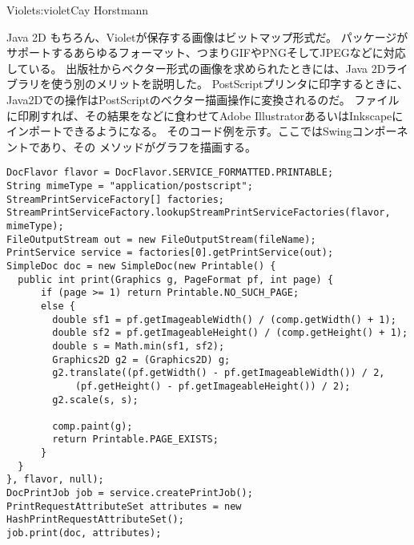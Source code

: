\begin{aosachapter}{Violet}{s:violet}{Cay Horstmann}
\begin{aosasect1}{Java 2D}
もちろん、Violetが保存する画像はビットマップ形式だ。
パッケージがサポートするあらゆるフォーマット、つまりGIFやPNGそしてJPEGなどに対応している。
出版社からベクター形式の画像を求められたときには、Java 2Dライブラリを使う別のメリットを説明した。
PostScriptプリンタに印字するときに、Java2Dでの操作はPostScriptのベクター描画操作に変換されるのだ。
ファイルに印刷すれば、その結果をなどに食わせてAdobe IllustratorあるいはInkscapeにインポートできるようになる。
そのコード例を示す。ここではSwingコンポーネントであり、その
メソッドがグラフを描画する。

\begin{verbatim}
DocFlavor flavor = DocFlavor.SERVICE_FORMATTED.PRINTABLE;
String mimeType = "application/postscript";
StreamPrintServiceFactory[] factories;
StreamPrintServiceFactory.lookupStreamPrintServiceFactories(flavor, mimeType);
FileOutputStream out = new FileOutputStream(fileName);
PrintService service = factories[0].getPrintService(out);            
SimpleDoc doc = new SimpleDoc(new Printable() {
  public int print(Graphics g, PageFormat pf, int page) {
      if (page >= 1) return Printable.NO_SUCH_PAGE;
      else {
        double sf1 = pf.getImageableWidth() / (comp.getWidth() + 1);
        double sf2 = pf.getImageableHeight() / (comp.getHeight() + 1);
        double s = Math.min(sf1, sf2);
        Graphics2D g2 = (Graphics2D) g;
        g2.translate((pf.getWidth() - pf.getImageableWidth()) / 2, 
            (pf.getHeight() - pf.getImageableHeight()) / 2);
        g2.scale(s, s);
                        
        comp.paint(g);
        return Printable.PAGE_EXISTS;
      }
  }
}, flavor, null);
DocPrintJob job = service.createPrintJob();
PrintRequestAttributeSet attributes = new HashPrintRequestAttributeSet();
job.print(doc, attributes);
\end{verbatim}


\end{aosasect1}
\end{aosachapter}
